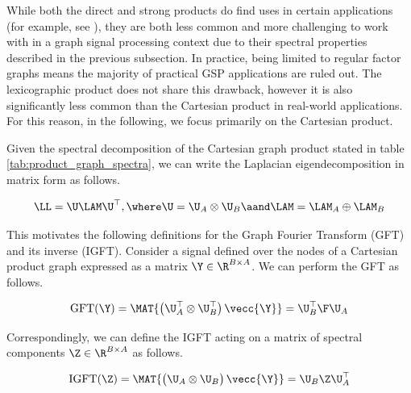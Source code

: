 While both the direct and strong products do find uses in certain applications (for example, see \citep{Kaveh2011}), they are both less common and more challenging to work with in a graph signal processing context due to their spectral properties described in the previous subsection. In practice, being limited to regular factor graphs means the majority of practical GSP applications are ruled out. The lexicographic product does not share this drawback, however it is also significantly less common than the Cartesian product in real-world applications. For this reason, in the following, we focus primarily on the Cartesian product. 

Given the spectral decomposition of the Cartesian graph product stated in table \ref{tab:product_graph_spectra}, we can write the Laplacian eigendecomposition in matrix form as follows. 

\begin{equation}
    \LL = \U \LAM \U^\top, \where \U = \U_A \otimes \U_B \aand \LAM = \LAM_A \oplus \LAM_B
\end{equation}

This motivates the following definitions for the Graph Fourier Transform (GFT) and its inverse (IGFT). Consider a signal defined over the nodes of a Cartesian product graph expressed as a matrix $\Y \in \R^{B \times A}$. We can perform the GFT as follows. 

\begin{equation}
    \text{GFT}(\Y) = \MAT{\big( \U_A^\top \otimes \U_B^\top \big) \, \vecc{\Y}} = \U_B^\top \F \U_A
\end{equation}

Correspondingly, we can define the IGFT acting on a matrix of spectral components $\Z \in \R^{B \times A}$ as follows. 

\begin{equation}
    \text{IGFT}(\Z) = \MAT{\big( \U_A \otimes \U_B \big)\,\vecc{\Y}} = \U_B \Z \U_A^\top
\end{equation}


